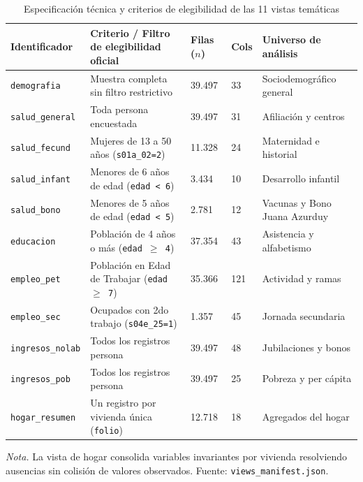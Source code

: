 \begin{table}[htbp]
\centering
\caption{Especificación técnica y criterios de elegibilidad de las 11 vistas temáticas}
\label{tab:vistas_tematicas}
\begin{tabularx}{\textwidth}{>{\raggedright\arraybackslash\small}p{2.85cm}>{\raggedright\arraybackslash\small}p{4.35cm}>{\raggedleft\arraybackslash\small}p{1.2cm}>{\raggedleft\arraybackslash\small}p{1.1cm}>{\raggedright\arraybackslash\small}X}
\toprule
\textbf{Identificador} & \textbf{Criterio / Filtro de elegibilidad oficial} & \textbf{Filas ($n$)} & \textbf{Cols} & \textbf{Universo de análisis} \\
\midrule
\texttt{\small demografia} & Muestra completa sin filtro restrictivo & 39.497 & 33 & Sociodemográfico general \\
\texttt{\small salud\_general} & Toda persona encuestada & 39.497 & 31 & Afiliación y centros \\
\texttt{\small salud\_fecund} & Mujeres de 13 a 50 años (\texttt{\small s01a\_02=2}) & 11.328 & 24 & Maternidad e historial \\
\texttt{\small salud\_infant} & Menores de 6 años de edad (\texttt{\small edad < 6}) & 3.434 & 10 & Desarrollo infantil \\
\texttt{\small salud\_bono} & Menores de 5 años de edad (\texttt{\small edad < 5}) & 2.781 & 12 & Vacunas y Bono Juana Azurduy \\
\texttt{\small educacion} & Población de 4 años o más (\texttt{\small edad $\ge$ 4}) & 37.354 & 43 & Asistencia y alfabetismo \\
\texttt{\small empleo\_pet} & Población en Edad de Trabajar (\texttt{\small edad $\ge$ 7}) & 35.366 & 121 & Actividad y ramas \\
\texttt{\small empleo\_sec} & Ocupados con 2do trabajo (\texttt{\small s04e\_25=1}) & 1.357 & 45 & Jornada secundaria \\
\texttt{\small ingresos\_nolab}& Todos los registros persona & 39.497 & 48 & Jubilaciones y bonos \\
\texttt{\small ingresos\_pob} & Todos los registros persona & 39.497 & 25 & Pobreza y per cápita \\
\texttt{\small hogar\_resumen} & Un registro por vivienda única (\texttt{\small folio}) & 12.718 & 18 & Agregados del hogar \\
\bottomrule
\end{tabularx}
\par\vspace{3pt}\parbox{\textwidth}{\footnotesize\textit{Nota.} La vista de hogar consolida variables invariantes por vivienda resolviendo ausencias sin colisión de valores observados. Fuente: \texttt{views\_manifest.json}.}
\end{table}

